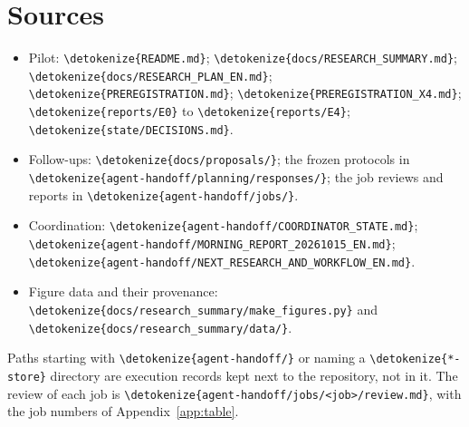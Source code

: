 \documentclass[11pt,a4paper]{article}
\DeclareRobustCommand{\_}{\ifmmode\origunderscore\else\textunderscore\allowbreak\fi}
\DeclareRobustCommand{\fpath}[1]{\begingroup\small\expandafter\nolinkurl\expandafter{\detokenize{#1}}\endgroup}
\begin{document}
\section{Sources}\label{app:sources}
\begin{itemize}
\item Pilot: \fpath{README.md}; \fpath{docs/RESEARCH_SUMMARY.md}; \fpath{docs/RESEARCH_PLAN_EN.md};
\fpath{PREREGISTRATION.md}; \fpath{PREREGISTRATION_X4.md}; \fpath{reports/E0} to \fpath{reports/E4};
\fpath{state/DECISIONS.md}.
\item Follow-ups: \fpath{docs/proposals/}; the frozen protocols in
\fpath{agent-handoff/planning/responses/}; the job reviews and reports in
\fpath{agent-handoff/jobs/}.
\item Coordination: \fpath{agent-handoff/COORDINATOR_STATE.md};\newline
\fpath{agent-handoff/MORNING_REPORT_20261015_EN.md};\newline
\fpath{agent-handoff/NEXT_RESEARCH_AND_WORKFLOW_EN.md}.
\item Figure data and their provenance: \fpath{docs/research_summary/make_figures.py} and
\fpath{docs/research_summary/data/}.
\end{itemize}
Paths starting with \fpath{agent-handoff/} or naming a \fpath{*-store} directory are execution
records kept next to the repository, not in it. The review of each job is
\fpath{agent-handoff/jobs/<job>/review.md}, with the job numbers of Appendix~\ref{app:table}.

\clearpage


\end{document}
